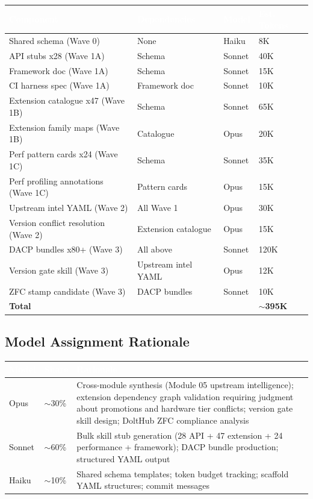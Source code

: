 \documentclass[11pt,letterpaper]{article}
\newcommand{\tableheader}[1]{\textbf{\sffamily\textcolor{white}{#1}}}
\begin{document}
\begin{center}
\begin{tabularx}{\textwidth}{L{4cm}L{3cm}C{1.5cm}C{2cm}}
\toprule
{}
\tableheader{Component} & \tableheader{Dependencies} & \tableheader{Model} & \tableheader{Est. Tokens} \\
\midrule
Shared schema (Wave 0) & None & Haiku & 8K \\
API stubs x28 (Wave 1A) & Schema & Sonnet & 40K \\
Framework doc (Wave 1A) & Schema & Sonnet & 15K \\
CI harness spec (Wave 1A) & Framework doc & Sonnet & 10K \\
Extension catalogue x47 (Wave 1B) & Schema & Sonnet & 65K \\
Extension family maps (Wave 1B) & Catalogue & Opus & 20K \\
Perf pattern cards x24 (Wave 1C) & Schema & Sonnet & 35K \\
Perf profiling annotations (Wave 1C) & Pattern cards & Opus & 15K \\
Upstream intel YAML (Wave 2) & All Wave 1 & Opus & 30K \\
Version conflict resolution (Wave 2) & Extension catalogue & Opus & 15K \\
DACP bundles x80+ (Wave 3) & All above & Sonnet & 120K \\
Version gate skill (Wave 3) & Upstream intel YAML & Opus & 12K \\
ZFC stamp candidate (Wave 3) & DACP bundles & Sonnet & 10K \\
\hline
{}
\textbf{Total} & & & \textbf{$\sim$395K} \\
\bottomrule
\end{tabularx}
\end{center}

\subsection{Model Assignment Rationale}

\begin{center}
\begin{tabularx}{\textwidth}{C{1.5cm}C{1.5cm}X}
\toprule
{}
\tableheader{Model} & \tableheader{Share} & \tableheader{Rationale} \\
\midrule
Opus & $\sim$30\% & Cross-module synthesis (Module 05 upstream intelligence); extension dependency graph validation requiring judgment about promotions and hardware tier conflicts; version gate skill design; DoltHub ZFC compliance analysis \\
Sonnet & $\sim$60\% & Bulk skill stub generation (28 API + 47 extension + 24 performance + framework); DACP bundle production; structured YAML output \\
Haiku & $\sim$10\% & Shared schema templates; token budget tracking; scaffold YAML structures; commit messages \\
\bottomrule
\end{tabularx}
\end{center}
\end{document}
